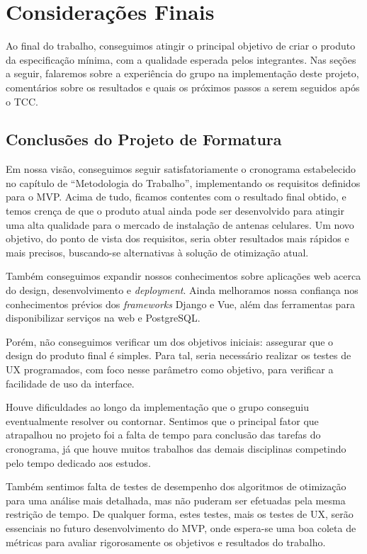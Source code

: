 \documentclass[]{politex}
\begin{document}
\chapter{Considerações Finais}

Ao final do trabalho, conseguimos atingir o principal objetivo de criar o
produto da especificação mínima, com a qualidade esperada pelos integrantes. Nas
seções a seguir, falaremos sobre a experiência do grupo na implementação deste
projeto, comentários sobre os resultados e quais os próximos passos a serem
seguidos após o TCC.

\section{Conclusões do Projeto de Formatura}

Em nossa visão, conseguimos seguir satisfatoriamente o cronograma estabelecido
no capítulo de ``Metodologia do Trabalho'', implementando os requisitos
definidos para o MVP. Acima de tudo, ficamos contentes com o resultado final
obtido, e temos crença de que o produto atual ainda pode ser desenvolvido para
atingir uma alta qualidade para o mercado de instalação de antenas celulares. Um
novo objetivo, do ponto de vista dos requisitos, seria obter resultados mais
rápidos e mais precisos, buscando-se alternativas à solução de otimização atual.

Também conseguimos expandir nossos conhecimentos sobre aplicações web acerca do
design, desenvolvimento e \textit{deployment}. Ainda melhoramos nossa confiança
nos conhecimentos prévios dos \textit{frameworks} Django e Vue, além das
ferramentas para disponibilizar serviços na web e PostgreSQL.

Porém, não conseguimos verificar um dos objetivos iniciais: assegurar que
o design do produto final é simples. Para tal, seria necessário realizar os
testes de UX programados, com foco nesse parâmetro como objetivo, para verificar
a facilidade de uso da interface.

Houve dificuldades ao longo da implementação que o grupo conseguiu eventualmente
resolver ou contornar. Sentimos que o principal fator que atrapalhou no projeto
foi a falta de tempo para conclusão das tarefas do cronograma, já que houve
muitos trabalhos das demais disciplinas competindo pelo tempo dedicado aos
estudos.

Também sentimos falta de testes de desempenho dos algoritmos de otimização para
uma análise mais detalhada, mas não puderam ser efetuadas pela mesma restrição
de tempo. De qualquer forma, estes testes, mais os testes de UX, serão
essenciais no futuro desenvolvimento do MVP, onde espera-se uma boa coleta de
métricas para avaliar rigorosamente os objetivos e resultados do trabalho.
\end{document}

